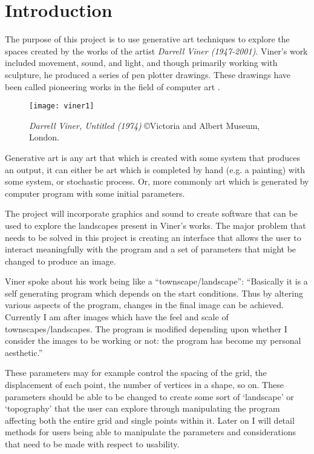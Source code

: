 \chapter{Introduction}
The purpose of this project is to use generative art techniques to explore the
spaces created by the works of the artist \emph{Darrell Viner (1947-2001)}. Viner's work
included movement, sound, and light, and though primarily working with
sculpture, he produced a series of pen plotter drawings. These drawings have
been called pioneering works in the field of computer art \citep{viner_bio}.

\begin{figure}[H]
    \texttt{[image: viner1]}
    \centering
    \caption{\emph{Darrell Viner, Untitled (1974)} \copyright Victoria and Albert Museum, London.}
\end{figure}

Generative art is any art that which is created with some system that produces
an output, it can either be art which is completed by hand (e.g. a painting)
with some system, or stochastic process. Or, more commonly art which is
generated by computer program with some initial parameters.

The project will incorporate graphics and sound to create software that can be
used to explore the landscapes present in Viner's works. The major problem that
needs to be solved in this project is creating an interface that allows the user
to interact meaningfully with the program and a set of parameters that might be
changed to produce an image.

Viner spoke about his work being like a ``townscape/landscape'': 
``Basically it is a self generating program which depends on the start
conditions. Thus by altering various aspects of the program, changes in the
final image can be achieved. Currently I am after images which have the feel and
scale of townscapes/landscapes. The program is modified depending upon whether I
consider the images to be working or not: the program has become my personal
aesthetic.'' \cite{viner_artiststatement}

These parameters may for example control the spacing of the grid, the
displacement of each point, the number of vertices in a shape, so on. These
parameters should be able to be changed to create some sort of `landscape' or
`topography' that the user can explore through manipulating the program
affecting both the entire grid and single points within it. Later on I will
detail methods for users being able to manipulate the parameters and
considerations that need to be made with respect to usability.

